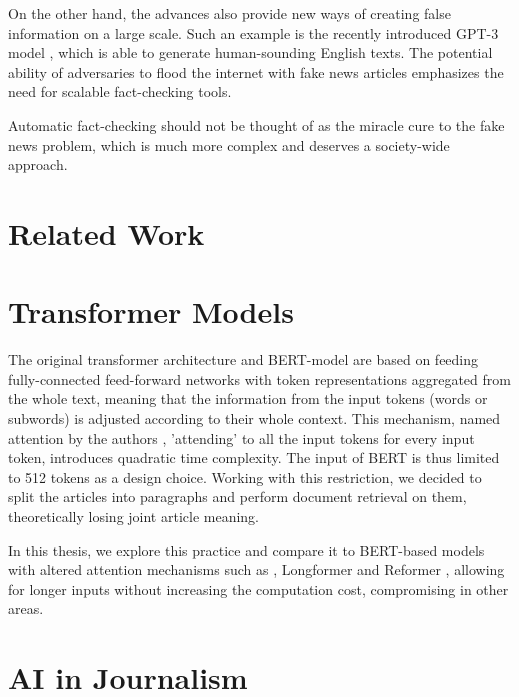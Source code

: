 On the other hand, the advances also provide new ways of creating false information on a large scale. Such an example is the recently introduced GPT-3 model \citep{gpt}, which is able to generate human-sounding English texts.
The potential ability of adversaries to flood the internet with fake news articles emphasizes the need for scalable fact-checking tools.

Automatic fact-checking should not be thought of as the miracle cure to the fake news problem, which is much more complex and deserves a society-wide approach.

\section*{Related Work}

\section*{Transformer Models}

The original transformer architecture \citep{transformers-vaswani} and BERT-model \citep{bert} are based on feeding fully-connected feed-forward networks with token representations aggregated from the whole text, meaning that the information from the input tokens (words or subwords) is adjusted according to their whole context. 
This mechanism, named attention by the authors \citep{transformers-vaswani}, 'attending' to all the input tokens for every input token, introduces quadratic time complexity. 
The input of BERT is thus limited to 512 tokens as a design choice.
Working with this restriction, we decided to split the \CTK{} articles into paragraphs and perform document retrieval on them, theoretically losing joint article meaning.

In this thesis, we explore this practice and compare it to BERT-based models with altered attention mechanisms such as \nystr{} \citep{nystrom}, Longformer \citep{longformer} and Reformer \citep{reformer}, allowing for longer inputs without increasing the computation cost, compromising in other areas.

\section*{AI in Journalism}


